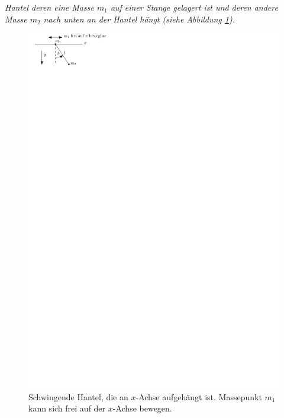 \begin{beispiel*}
	\textit{Hantel deren eine Masse $m_1$ auf einer Stange gelagert ist und deren andere Masse $m_2$ nach unten an der Hantel hängt (siehe Abbildung \ref{fig:ch1_schwingendehantel}).}
	
	\begin{figure}
		\centering
		\includegraphics{figures/ch1/schwingendehantel}
		\caption{Schwingende Hantel, die an $x$-Achse aufgehängt ist. Massepunkt $m_1$ kann sich frei auf der $x$-Achse bewegen.}
		\label{fig:ch1_schwingendehantel}	
	\end{figure}


\end{beispiel*}
